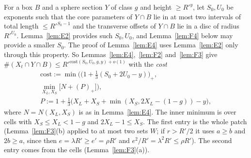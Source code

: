 \documentclass[aps,prx,twocolumn,superscriptaddress,nofootinbib,longbibliography]{revtex4-2}
\theoremstyle{plain}
\theoremstyle{definition}
\theoremstyle{remark}
\begin{document}
For a box $B$ and a sphere section $Y$ of class $g$ and height $\ge R'^y$, let $S_0,U_0$ be exponents such that the core parameters of $Y\cap B$ lie in at most two intervals of total length $\le R'^{S_0-1}$ and the transverse offsets of $Y\cap B$ lie in a disc of radius $R'^{U_0}$. Lemma~\ref{lem:E2} provides such $S_0,U_0$, and Lemma~\ref{lem:F4} below may provide a smaller $S_0$. The proof of Lemma~\ref{lem:E4} uses Lemma~\ref{lem:E2} only through this property. So Lemmas~\ref{lem:E4},~\ref{lem:F2} and~\ref{lem:F3} give $\#(X_t\cap Y\cap B)\le R'^{\mathrm{cost}(S_0,U_0,g,y)+o(1)}$ with the \emph{cost}
\begin{equation}\label{eq:cost}
\begin{gathered}
\mathrm{cost}:=\min\Big(\big(1+\tfrac13(S_0+2U_0-y)\big)_+,\\ \min_{X_L,X_S}\big[N+(P)_+\big]\Big),\\
P:=1+\tfrac13\big(X_L+X_S+\min(X_S,2X_L-(1-g))-y\big),
\end{gathered}
\end{equation}
where $N=N(X_L,X_S)$ is as in Lemma~\ref{lem:E4}. The inner minimum is over cells with $X_S\le X_L<1-g$ and $2X_L-1\le X_S$. The first entry is the whole patch (Lemma~\ref{lem:F3}(b) applied to at most two sets $W$; if $r>R'/2$ it uses $a\ge b$ and $2b\ge a$, since then $e=\lambda R'\ge e'=\rho R'$ and $e^2/R'=\lambda^2R'\le\rho R'$). The second entry comes from the cells (Lemma~\ref{lem:F3}(a)).
\end{document}
